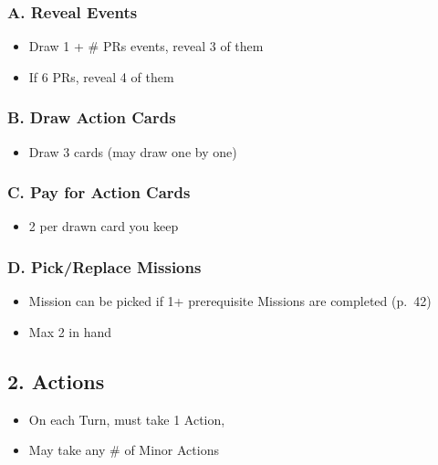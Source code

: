 \documentclass[10pt]{article}
\begin{document}
\subsubsection*{A. Reveal Events}
\begin{itemize}
	\item Draw 1 + \# PRs events, reveal 3 of them
\end{itemize}
\begin{itemize}
	\item If 6 PRs, reveal 4 of them
\end{itemize}
\subsubsection*{B. Draw Action Cards}

\begin{itemize}
	\item Draw 3 cards (may draw one by one)
\end{itemize}

\subsubsection*{C. Pay for Action Cards}
\begin{itemize}
	\item 2 \ducats per drawn card you keep
\end{itemize}

\subsubsection*{D. Pick/Replace Missions}
\begin{itemize}
	\item Mission can be picked if 1+ prerequisite Missions are completed (p.~42)
	\item Max 2 in hand
\end{itemize}

\subsection*{2. Actions}
\begin{itemize}
	\item On each Turn, must take 1 Action, 
	\item May take any \# of Minor Actions
\end{itemize}
\end{document}
